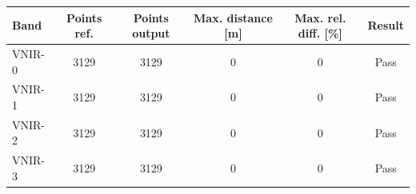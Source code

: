 \begin{tabular}{lccccc}
\toprule
Band & Points ref. & Points output & Max. distance [m] & Max. rel. diff. [\%] & Result \\
\midrule
VNIR-0 & 3129 & 3129 & $0$ & $0$ & Pass \\
VNIR-1 & 3129 & 3129 & $0$ & $0$ & Pass \\
VNIR-2 & 3129 & 3129 & $0$ & $0$ & Pass \\
VNIR-3 & 3129 & 3129 & $0$ & $0$ & Pass \\
\bottomrule
\end{tabular}

